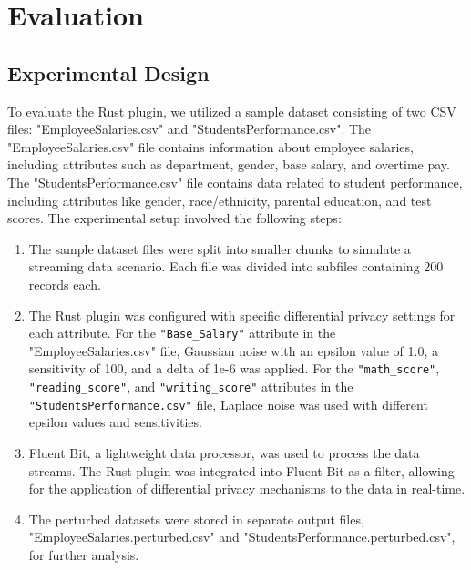 \chapter{Evaluation\label{chap:evaluation}}
\section{Experimental Design}
To evaluate the Rust plugin, we utilized a sample dataset consisting of two CSV files: "EmployeeSalaries.csv" and "StudentsPerformance.csv". The "EmployeeSalaries.csv" file contains information about employee salaries, including attributes such as department, gender, base salary, and overtime pay. The "StudentsPerformance.csv" file contains data related to student performance, including attributes like gender, race/ethnicity, parental education, and test scores.
The experimental setup involved the following steps:

\begin{enumerate}
    \item The sample dataset files were split into smaller chunks to simulate a streaming data scenario. Each file was divided into subfiles containing 200 records each.
    \item The Rust plugin was configured with specific differential privacy settings for each attribute. For the \texttt{"Base\_Salary"} attribute in the "EmployeeSalaries.csv" file, Gaussian noise with an epsilon value of 1.0, a sensitivity of 100, and a delta of 1e-6 was applied. For the \texttt{"math\_score"}, \texttt{"reading\_score"}, and \texttt{"writing\_score"} attributes in the \texttt{"StudentsPerformance.csv"} file, Laplace noise was used with different epsilon values and sensitivities.
    \item Fluent Bit, a lightweight data processor, was used to process the data streams. The Rust plugin was integrated into Fluent Bit as a filter, allowing for the application of differential privacy mechanisms to the data in real-time.
    \item The perturbed datasets were stored in separate output files, "EmployeeSalaries.perturbed.csv" and "StudentsPerformance.perturbed.csv", for further analysis.
\end{enumerate}

